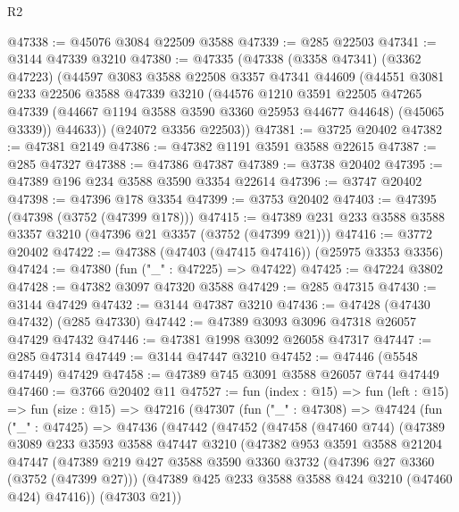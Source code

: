 \begin{lexlean}{R2}
\begin{coremodule}
@47338 := @45076 @3084 @22509 @3588
@47339 := @285 @22503
@47341 := @3144 @47339 @3210
@47380 := @47335
    (@47338
      (@3358 @47341)
      (@3362 @47223)
      (@44597
        @3083
        @3588
        @22508
        @3357
        @47341
        @44609
        (@44551
          @3081
          @233
          @22506
          @3588
          @47339
          @3210
          (@44576
            @1210
            @3591
            @22505
            @47265
            @47339
            (@44667 @1194 @3588 @3590 @3360 @25953 @44677 @44648)
            (@45065 @3339))
          @44633))
      (@24072 @3356 @22503))
@47381 := @3725 @20402
@47382 := @47381 @2149
@47386 := @47382 @1191 @3591 @3588 @22615
@47387 := @285 @47327
@47388 := @47386 @47387
@47389 := @3738 @20402
@47395 := @47389 @196 @234 @3588 @3590 @3354 @22614
@47396 := @3747 @20402
@47398 := @47396 @178 @3354
@47399 := @3753 @20402
@47403 := @47395 (@47398 (@3752 (@47399 @178)))
@47415 := @47389 @231 @233 @3588 @3588 @3357 @3210 (@47396 @21 @3357 (@3752 (@47399 @21)))
@47416 := @3772 @20402
@47422 := @47388 (@47403 (@47415 @47416)) (@25975 @3353 @3356)
@47424 := @47380 (fun ("_" : @47225) => @47422)
@47425 := @47224 @3802
@47428 := @47382 @3097 @47320 @3588
@47429 := @285 @47315
@47430 := @3144 @47429
@47432 := @3144 @47387 @3210
@47436 := @47428 (@47430 @47432) (@285 @47330)
@47442 := @47389 @3093 @3096 @47318 @26057 @47429 @47432
@47446 := @47381 @1998 @3092 @26058 @47317
@47447 := @285 @47314
@47449 := @3144 @47447 @3210
@47452 := @47446 (@5548 @47449) @47429
@47458 := @47389 @745 @3091 @3588 @26057 @744 @47449
@47460 := @3766 @20402 @11
@47527 := fun (index : @15) =>
  fun (left : @15) =>
  fun (size : @15) =>
  @47216
    (@47307
      (fun ("_" : @47308) =>
      @47424
        (fun ("_" : @47425) =>
        @47436
          (@47442
            (@47452
              (@47458
                (@47460 @744)
                (@47389
                  @3089
                  @233
                  @3593
                  @3588
                  @47447
                  @3210
                  (@47382
                    @953
                    @3591
                    @3588
                    @21204
                    @47447
                    (@47389
                      @219
                      @427
                      @3588
                      @3590
                      @3360
                      @3732
                      (@47396 @27 @3360 (@3752 (@47399 @27)))
                      (@47389 @425 @233 @3588 @3588 @424 @3210 (@47460 @424) @47416))
                    (@47303 @21))

\end{coremodule}
\end{lexlean}
